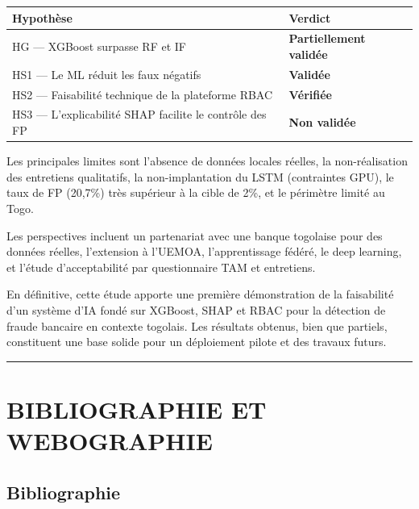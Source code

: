 \documentclass[
  12pt,
]{article}
\newcounter{none} %
\begin{document}
{\def\LTcaptype{none} %
\begin{longtable}[]{@{}
  >{\raggedright\arraybackslash}p{}
  >{\raggedright\arraybackslash}p{}@{}}
\toprule\noalign{}
\begin{minipage}[b]{\linewidth}\raggedright
Hypothèse
\end{minipage} & \begin{minipage}[b]{\linewidth}\raggedright
Verdict
\end{minipage} \\
\midrule\noalign{}
\endhead
\bottomrule\noalign{}
\endlastfoot
HG — XGBoost surpasse RF et IF & \textbf{Partiellement validée} \\
HS1 — Le ML réduit les faux négatifs & \textbf{Validée} \\
HS2 — Faisabilité technique de la plateforme RBAC & \textbf{Vérifiée} \\
HS3 — L’explicabilité SHAP facilite le contrôle des FP & \textbf{Non
validée} \\
\end{longtable}
}

Les principales limites sont l’absence de données locales réelles, la
non-réalisation des entretiens qualitatifs, la non-implantation du LSTM
(contraintes GPU), le taux de FP (20,7\%) très supérieur à la cible de
2\%, et le périmètre limité au Togo.

Les perspectives incluent un partenariat avec une banque togolaise pour
des données réelles, l’extension à l’UEMOA, l’apprentissage fédéré, le
deep learning, et l’étude d’acceptabilité par questionnaire TAM et
entretiens.

En définitive, cette étude apporte une première démonstration de la
faisabilité d’un système d’IA fondé sur XGBoost, SHAP et RBAC pour la
détection de fraude bancaire en contexte togolais. Les résultats
obtenus, bien que partiels, constituent une base solide pour un
déploiement pilote et des travaux futurs.

\begin{center}\rule{0.5\linewidth}{0.5pt}\end{center}

\section{BIBLIOGRAPHIE ET
WEBOGRAPHIE}\label{bibliographie-et-webographie}

\subsection{Bibliographie}\label{bibliographie}
\end{document}
